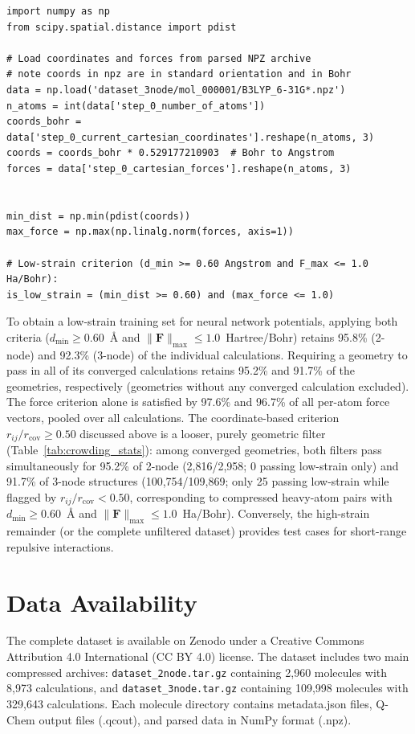 \documentclass[fleqn,10pt]{article}
\begin{document}
\begin{verbatim}
import numpy as np
from scipy.spatial.distance import pdist

# Load coordinates and forces from parsed NPZ archive
# note coords in npz are in standard orientation and in Bohr
data = np.load('dataset_3node/mol_000001/B3LYP_6-31G*.npz')
n_atoms = int(data['step_0_number_of_atoms'])
coords_bohr = data['step_0_current_cartesian_coordinates'].reshape(n_atoms, 3)
coords = coords_bohr * 0.529177210903  # Bohr to Angstrom
forces = data['step_0_cartesian_forces'].reshape(n_atoms, 3)


min_dist = np.min(pdist(coords))
max_force = np.max(np.linalg.norm(forces, axis=1))

# Low-strain criterion (d_min >= 0.60 Angstrom and F_max <= 1.0 Ha/Bohr):
is_low_strain = (min_dist >= 0.60) and (max_force <= 1.0)
\end{verbatim}

To obtain a low-strain training set for neural network potentials, applying both criteria ($d_{\min} \geq 0.60$~\AA{} and $\|\mathbf{F}\|_{\max} \leq 1.0$~Hartree/Bohr) retains 95.8\% (2-node) and 92.3\% (3-node) of the individual calculations. Requiring a geometry to pass in all of its converged calculations retains 95.2\% and 91.7\% of the geometries, respectively (geometries without any converged calculation excluded). The force criterion alone is satisfied by 97.6\% and 96.7\% of all per-atom force vectors, pooled over all calculations. The coordinate-based criterion $r_{ij}/r_{\mathrm{cov}} \geq 0.50$ discussed above is a looser, purely geometric filter (Table~\ref{tab:crowding_stats}): among converged geometries, both filters pass simultaneously for 95.2\% of 2-node (2,816/2,958; 0 passing low-strain only) and 91.7\% of 3-node structures (100,754/109,869; only 25 passing low-strain while flagged by $r_{ij}/r_{\mathrm{cov}} < 0.50$, corresponding to compressed heavy-atom pairs with $d_{\min} \geq 0.60$~\AA{} and $\|\mathbf{F}\|_{\max} \leq 1.0$~Ha/Bohr).
Conversely, the high-strain remainder (or the complete unfiltered dataset) provides test cases for short-range repulsive interactions.

\section*{Data Availability}

The complete dataset is available on Zenodo\cite{zenodo_doi} under a Creative Commons Attribution 4.0 International (CC BY 4.0) license. The dataset includes two main compressed archives: \texttt{dataset\_2node.tar.gz} containing 2,960 molecules with 8,973 calculations, and \texttt{dataset\_3node.tar.gz} containing 109,998 molecules with 329,643 calculations. Each molecule directory contains metadata.json files, Q-Chem output files (.qcout), and parsed data in NumPy format (.npz).
\end{document}
